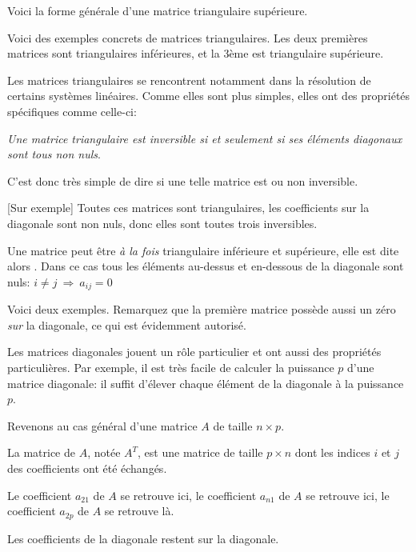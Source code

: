 \change
Voici la forme générale d'une matrice triangulaire supérieure.


\diapo

Voici des exemples concrets de matrices triangulaires.
Les deux premières matrices sont triangulaires inférieures, et la 3ème est triangulaire supérieure.

\change
Les matrices triangulaires se rencontrent notamment dans la résolution de certains systèmes linéaires.
Comme elles sont plus simples, elles ont des propriétés spécifiques comme celle-ci: 

\emph{Une matrice triangulaire est inversible 
si et seulement si ses éléments diagonaux sont tous non nuls}.

C'est donc très simple de dire si une telle matrice est ou non inversible.

[Sur exemple] Toutes ces matrices sont triangulaires, les coefficients sur la diagonale sont non nuls, donc elles sont toutes trois inversibles.


\diapo

Une matrice peut être \emph{à la fois} triangulaire inférieure et supérieure, elle est dite alors
. Dans ce cas tous les éléments au-dessus et en-dessous de la diagonale
sont nuls: $i\neq j \ \Longrightarrow \ a_{ij} = 0$

\change
Voici deux exemples. Remarquez que la première matrice possède aussi un zéro \emph{sur}
la diagonale, ce qui est évidemment autorisé.

\change
Les matrices diagonales jouent un rôle particulier et ont aussi des propriétés particulières.
Par exemple, il est très facile de calculer la puissance $p$ d'une matrice diagonale: 
il suffit d'élever chaque élément de la diagonale à la puissance $p$.

\diapo

Revenons au cas général d'une matrice $A$ de taille $n \times p$.

\change
La matrice  de $A$, notée $A^T$, est une matrice de taille $p \times n$ dont les 
indices $i$ et $j$ des coefficients ont été échangés.


Le coefficient $a_{21}$ de $A$ se retrouve ici,
le coefficient $a_{n1}$ de $A$ se retrouve ici,
le coefficient $a_{2p}$ de $A$ se retrouve là.

Les coefficients de la diagonale restent sur la diagonale.

